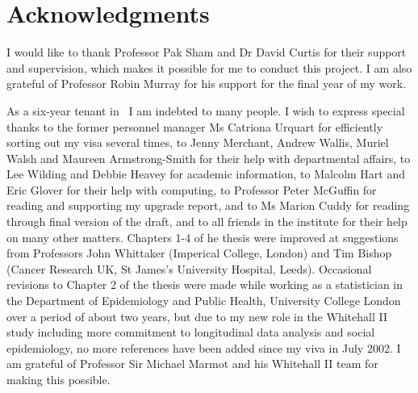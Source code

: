 
\newpage
\pagestyle{empty}
\setcounter{savepage}{\thepage}
\begin{abstractpage}

\end{abstractpage}
\newpage

% 

\newpage

\section*{Acknowledgments}

I would like to thank Professor Pak Sham and Dr David Curtis for their support
and supervision, which makes it possible for me to conduct this project.  I am
also grateful of Professor Robin Murray for his support for the final year of
my work.

As a six-year tenant in \IoP\ I am indebted to many people.  I wish to
express special thanks to the former personnel manager Ms Catriona Urquart
for efficiently sorting out my visa several times, to Jenny Merchant,
Andrew Wallis, Muriel Walsh and Maureen Armstrong-Smith for their help
with departmental affairs, to Lee Wilding and Debbie Heavey for academic
information, to Malcolm Hart and Eric Glover for their help with
computing, to Professor Peter McGuffin for reading and supporting my
upgrade report, and to Ms Marion Cuddy for reading through final version
of the draft, and to all friends in the institute for their help on many
other matters.  Chapters 1-4 of he thesis were improved at suggestions
from Professors John Whittaker (Imperical College, London) and Tim Bishop
(Cancer Research UK, St James's University Hospital, Leeds). Occasional
revisions to Chapter 2 of the thesis were made while working as a
statistician in the Department of Epidemiology and Public Health,
University College London over a period of about two years, but due to my
new role in the Whitehall II study including more commitment to
longitudinal data analysis and social epidemiology, no more references
have been added since my viva in July 2002. I am grateful of Professor Sir
Michael Marmot and his Whitehall II team for making this possible.

